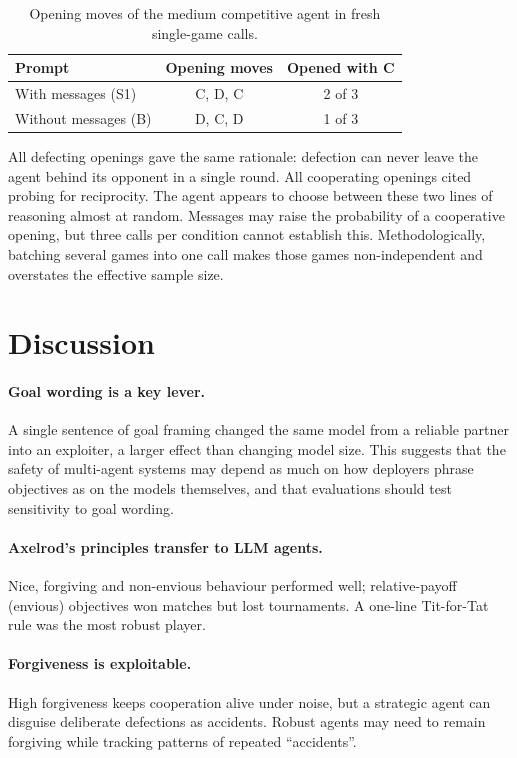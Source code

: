 \documentclass[11pt,a4paper]{article}
\begin{document}
\begin{table}[htbp]
\centering
\caption{Opening moves of the medium competitive agent in fresh single-game calls.}
\label{tab:check}
\begin{tabular}{@{}lcc@{}}
\toprule
Prompt & Opening moves & Opened with C \\
\midrule
With messages (S1)    & C, D, C & 2 of 3 \\
Without messages (B)  & D, C, D & 1 of 3 \\
\bottomrule
\end{tabular}
\end{table}

All defecting openings gave the same rationale: defection can never leave the agent behind its opponent in a single round. All cooperating openings cited probing for reciprocity. The agent appears to choose between these two lines of reasoning almost at random. Messages may raise the probability of a cooperative opening, but three calls per condition cannot establish this. Methodologically, batching several games into one call makes those games non-independent and overstates the effective sample size.

\section{Discussion}

\paragraph{Goal wording is a key lever.} A single sentence of goal framing changed the same model from a reliable partner into an exploiter, a larger effect than changing model size. This suggests that the safety of multi-agent systems may depend as much on how deployers phrase objectives as on the models themselves, and that evaluations should test sensitivity to goal wording.

\paragraph{Axelrod's principles transfer to LLM agents.} Nice, forgiving and non-envious behaviour performed well; relative-payoff (envious) objectives won matches but lost tournaments. A one-line Tit-for-Tat rule was the most robust player.

\paragraph{Forgiveness is exploitable.} High forgiveness keeps cooperation alive under noise, but a strategic agent can disguise deliberate defections as accidents. Robust agents may need to remain forgiving while tracking patterns of repeated ``accidents''.
\end{document}
